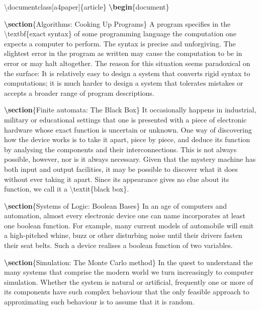 \documentclass[
]{book}
\newenvironment{Shaded}{\begin{snugshade}}{\end{snugshade}}
\newcommand{\BuiltInTok}[1]{#1}
\newcommand{\ExtensionTok}[1]{#1}
\newcommand{\FunctionTok}[1]{\textcolor[rgb]{0.00,0.00,0.00}{#1}}
\newcommand{\KeywordTok}[1]{\textcolor[rgb]{0.13,0.29,0.53}{\textbf{#1}}}
\newcommand{\NormalTok}[1]{#1}
\begin{document}
\begin{Shaded}
\begin{Highlighting}[]
\BuiltInTok{\textbackslash{}documentclass}\NormalTok{[a4paper]\{}\ExtensionTok{article}\NormalTok{\}}
\KeywordTok{\textbackslash{}begin}\NormalTok{\{}\ExtensionTok{document}\NormalTok{\}}


\KeywordTok{\textbackslash{}section}\NormalTok{\{Algorithms: Cooking Up Programs\}}
\NormalTok{A program specifies in the }\FunctionTok{\textbackslash{}textbf}\NormalTok{\{exact syntax\} of some programming language the computation one expects a computer to perform. The syntax is precise and unforgiving. The slightest error in the program as written may cause the computation to be in error or may halt altogether. The reason for this situation seems paradoxical on the surface: It is relatively easy to design a system that converts rigid syntax to computations; it is much harder to design a system that tolerates mistakes or accepts a broader range of program descriptions.}

\KeywordTok{\textbackslash{}section}\NormalTok{\{Finite automata: The Black Box\}}
\NormalTok{It occasionally happens in industrial, military or educational settings that one is presented with a piece of electronic hardware whose exact function is uncertain or unknown. One way of discovering how the device works is to take it apart, piece by piece, and deduce its function by analysing the components and their interconnections. This is not always possible, however, nor is it always necessary. Given that the mystery machine has both input and output facilities, it may be possible to discover what it does without ever taking it apart. Since its appearance gives no clue about its function, we call it a }\FunctionTok{\textbackslash{}textit}\NormalTok{\{black box\}.}

\KeywordTok{\textbackslash{}section}\NormalTok{\{Systems of Logic: Boolean Bases\}}
\NormalTok{In an age of computers and automation, almost every electronic device one can name incorporates at least one boolean function. For example, many current models of automobile will emit a high{-}pitched whine, buzz or other disturbing noise until their drivers fasten their seat belts. Such a device realises a boolean function of two variables.}

\KeywordTok{\textbackslash{}section}\NormalTok{\{Simulation: The Monte Carlo method\}}
\NormalTok{In the quest to understand the many systems that comprise the modern world we turn increasingly to computer simulation. Whether the system is natural or artificial, frequently one or more of its components have such complex behaviour that the only feasible approach to approximating such behaviour is to assume that it is random.}


\end{Highlighting}
\end{Shaded}
\end{document}
